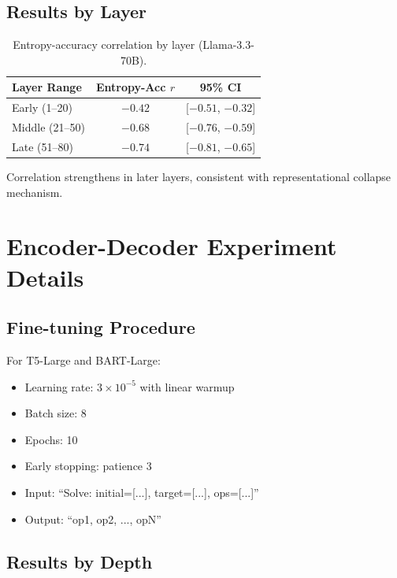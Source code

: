 \documentclass{article}
\theoremstyle{plain}
\theoremstyle{definition}
\theoremstyle{remark}
\begin{document}
\subsection{Results by Layer}

\begin{table}[h]
\centering
\caption{Entropy-accuracy correlation by layer (Llama-3.3-70B).}
\label{tab:entropy_layer}
\small
\begin{tabular}{@{}lcc@{}}
\toprule
\textbf{Layer Range} & \textbf{Entropy-Acc $r$} & \textbf{95\% CI} \\
\midrule
Early (1--20) & $-0.42$ & [$-0.51$, $-0.32$] \\
Middle (21--50) & $-0.68$ & [$-0.76$, $-0.59$] \\
Late (51--80) & $-0.74$ & [$-0.81$, $-0.65$] \\
\bottomrule
\end{tabular}
\end{table}

Correlation strengthens in later layers, consistent with representational collapse mechanism.


\section{Encoder-Decoder Experiment Details}
\label{app:enc_dec_details}

\subsection{Fine-tuning Procedure}

For T5-Large and BART-Large:
\begin{itemize}
\item Learning rate: $3 \times 10^{-5}$ with linear warmup
\item Batch size: 8
\item Epochs: 10
\item Early stopping: patience 3
\item Input: ``Solve: initial=[...], target=[...], ops=[...]''
\item Output: ``op1, op2, ..., opN''
\end{itemize}

\subsection{Results by Depth}
\end{document}
